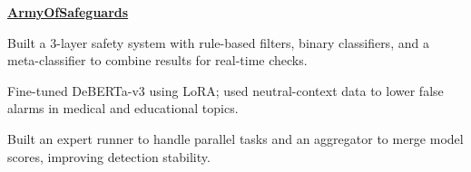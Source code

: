 \begin{twocolentry}{}
\href{https://github.com/faketut/ArmyOfSafeguards}{\textbf{ArmyOfSafeguards}}
\end{twocolentry}
\begin{onecolentry}
\begin{highlights}
\item Built a 3-layer safety system with rule-based filters, binary classifiers, and a meta-classifier to combine results for real-time checks.
\item Fine-tuned DeBERTa-v3 using LoRA; used neutral-context data to lower false alarms in medical and educational topics.
\item Built an expert runner to handle parallel tasks and an aggregator to merge model scores, improving detection stability.
\end{highlights}
\end{onecolentry}
